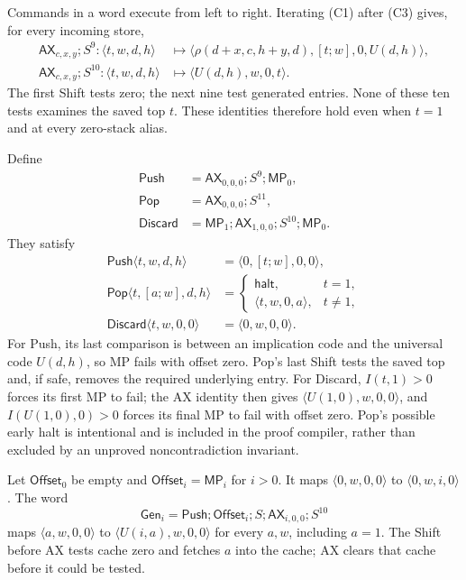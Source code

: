 Commands in a word execute from left to right.  Iterating (C1) after (C3)
gives, for every incoming store,
\begin{align*}
 \mathsf{AX}_{c,x,y};S^9:
 \langle t,w,d,h\rangle
  &\longmapsto
   \langle\rho(d+x,c,h+y,d),[t;w],0,U(d,h)\rangle,\\
 \mathsf{AX}_{c,x,y};S^{10}:
 \langle t,w,d,h\rangle
  &\longmapsto \langle U(d,h),w,0,t\rangle.
\end{align*}
The first Shift tests zero; the next nine test generated entries.
None of these ten tests examines the saved top $t$.  These identities
therefore hold even when $t=1$ and at every zero-stack alias.

Define
\begin{align*}
 \mathsf{Push}&=\mathsf{AX}_{0,0,0};S^9;\mathsf{MP}_0,\\
 \mathsf{Pop}&=\mathsf{AX}_{0,0,0};S^{11},\\
 \mathsf{Discard}&=\mathsf{MP}_1;\mathsf{AX}_{1,0,0};S^{10};
                    \mathsf{MP}_0.
\end{align*}
They satisfy
\begin{align*}
 \mathsf{Push}\langle t,w,d,h\rangle
  &=\langle0,[t;w],0,0\rangle,\\
 \mathsf{Pop}\langle t,[a;w],d,h\rangle
  &=\begin{cases}
    \mathsf{halt},&t=1,\\
    \langle t,w,0,a\rangle,&t\ne1,
   \end{cases}\\
 \mathsf{Discard}\langle t,w,0,0\rangle
  &=\langle0,w,0,0\rangle.
\end{align*}
For Push, its last comparison is between an implication code and the
universal code $U(d,h)$, so MP fails with offset zero.  Pop's last Shift
tests the saved top and, if safe, removes the required underlying entry.
For Discard, $I(t,1)>0$ forces its first MP to fail; the AX identity
then gives $\langle U(1,0),w,0,0\rangle$, and
$I(U(1,0),0)>0$ forces its final MP to fail with offset zero.
Pop's possible early halt is intentional and is included in the proof
compiler, rather than excluded by an unproved noncontradiction invariant.

Let $\mathsf{Offset}_0$ be empty and
$\mathsf{Offset}_i=\mathsf{MP}_i$ for $i>0$.  It maps
$\langle0,w,0,0\rangle$ to $\langle0,w,i,0\rangle$.
The word
\[
 \mathsf{Gen}_i=\mathsf{Push};\mathsf{Offset}_i;S;
                         \mathsf{AX}_{i,0,0};S^{10}
\]
maps $\langle a,w,0,0\rangle$ to
$\langle U(i,a),w,0,0\rangle$ for every $a,w$, including $a=1$.
The Shift before AX tests cache zero and fetches $a$ into the cache;
AX clears that cache before it could be tested.

